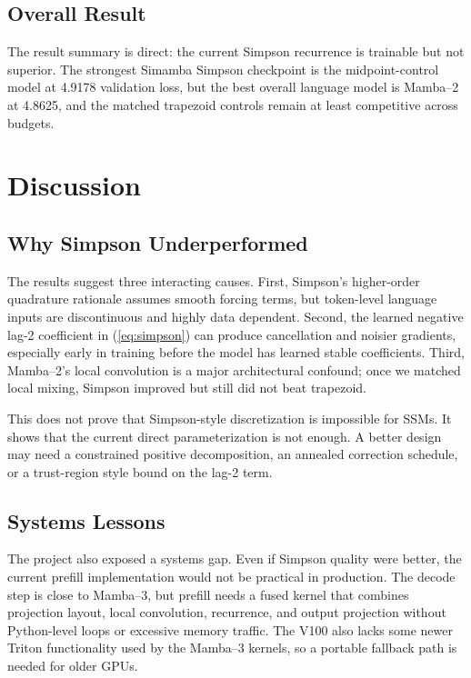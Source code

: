 \documentclass[conference]{IEEEtran}
\newcommand{\modelname}{Simamba\xspace}
\newcommand{\mambatwo}{Mamba--2\xspace}
\newcommand{\mambathree}{Mamba--3\xspace}
\begin{document}
\subsection{Overall Result}

The result summary is direct: the current Simpson recurrence is trainable but not superior. The strongest \modelname Simpson checkpoint is the midpoint-control model at 4.9178 validation loss, but the best overall language model is \mambatwo at 4.8625, and the matched trapezoid controls remain at least competitive across budgets.

\section{Discussion}

\subsection{Why Simpson Underperformed}

The results suggest three interacting causes. First, Simpson's higher-order quadrature rationale assumes smooth forcing terms, but token-level language inputs are discontinuous and highly data dependent. Second, the learned negative lag-2 coefficient in (\ref{eq:simpson}) can produce cancellation and noisier gradients, especially early in training before the model has learned stable coefficients. Third, \mambatwo's local convolution is a major architectural confound; once we matched local mixing, Simpson improved but still did not beat trapezoid.

This does not prove that Simpson-style discretization is impossible for SSMs. It shows that the current direct parameterization is not enough. A better design may need a constrained positive decomposition, an annealed correction schedule, or a trust-region style bound on the lag-2 term.

\subsection{Systems Lessons}

The project also exposed a systems gap. Even if Simpson quality were better, the current prefill implementation would not be practical in production. The decode step is close to \mambathree, but prefill needs a fused kernel that combines projection layout, local convolution, recurrence, and output projection without Python-level loops or excessive memory traffic. The V100 also lacks some newer Triton functionality used by the \mambathree kernels, so a portable fallback path is needed for older GPUs.
\end{document}
